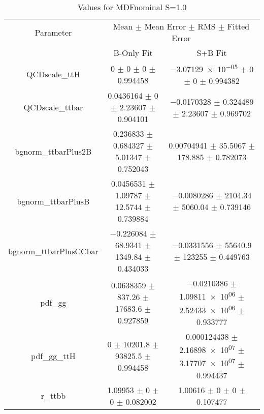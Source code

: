 \begin{table}
\centering
\caption{Values for MDFnominal S=1.0}
\begin{tabular}{ccc}
\toprule
Parameter & \multicolumn{2}{c}{Mean $\pm$ Mean Error $\pm$ RMS $\pm$ Fitted Error}\\
 & B-Only Fit & S+B Fit\\
\midrule
QCDscale\_ttH & \num{0} $\pm$ \num{0} $\pm$ \num{0} $\pm$ \num{0.994458} & \num{-3.07129e-05} $\pm$ \num{0} $\pm$ \num{0} $\pm$ \num{0.994382}\\
QCDscale\_ttbar & \num{0.0436164} $\pm$ \num{0} $\pm$ \num{2.23607} $\pm$ \num{0.904101} & \num{-0.0170328} $\pm$ \num{0.324489} $\pm$ \num{2.23607} $\pm$ \num{0.969702}\\
bgnorm\_ttbarPlus2B & \num{0.236833} $\pm$ \num{0.684327} $\pm$ \num{5.01347} $\pm$ \num{0.752043} & \num{0.00704941} $\pm$ \num{35.5067} $\pm$ \num{178.885} $\pm$ \num{0.782073}\\
bgnorm\_ttbarPlusB & \num{0.0456531} $\pm$ \num{1.09787} $\pm$ \num{12.5744} $\pm$ \num{0.739884} & \num{-0.0080286} $\pm$ \num{2104.34} $\pm$ \num{5060.04} $\pm$ \num{0.739146}\\
bgnorm\_ttbarPlusCCbar & \num{-0.226084} $\pm$ \num{68.9341} $\pm$ \num{1349.84} $\pm$ \num{0.434033} & \num{-0.0331556} $\pm$ \num{55640.9} $\pm$ \num{123255} $\pm$ \num{0.449763}\\
pdf\_gg & \num{0.0638359} $\pm$ \num{837.26} $\pm$ \num{17683.6} $\pm$ \num{0.927859} & \num{-0.0210386} $\pm$ \num{1.09811e+06} $\pm$ \num{2.52433e+06} $\pm$ \num{0.933777}\\
pdf\_gg\_ttH & \num{0} $\pm$ \num{10201.8} $\pm$ \num{93825.5} $\pm$ \num{0.994458} & \num{0.000124438} $\pm$ \num{2.16898e+07} $\pm$ \num{3.17707e+07} $\pm$ \num{0.994437}\\
r\_ttbb & \num{1.09953} $\pm$ \num{0} $\pm$ \num{0} $\pm$ \num{0.082002} & \num{1.00616} $\pm$ \num{0} $\pm$ \num{0} $\pm$ \num{0.107477}\\
\bottomrule
\end{tabular}
\end{table}